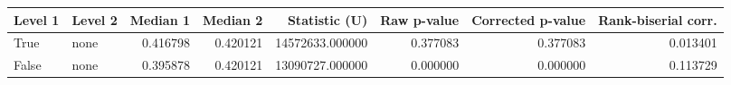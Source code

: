 \begin{tabular}{llrrrrrr}
\toprule
Level 1 & Level 2 & Median 1 & Median 2 & Statistic (U) & Raw p-value & Corrected p-value & Rank-biserial corr. \\
\midrule
True & none & 0.416798 & 0.420121 & 14572633.000000 & 0.377083 & 0.377083 & 0.013401 \\
False & none & 0.395878 & 0.420121 & 13090727.000000 & 0.000000 & 0.000000 & 0.113729 \\
\bottomrule
\end{tabular}
